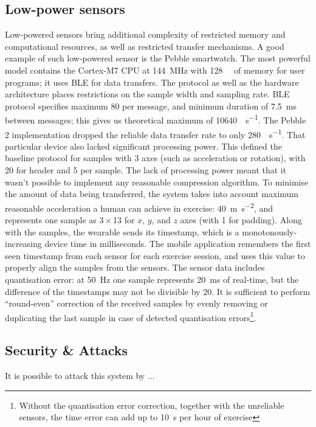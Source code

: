 \subsection{Low-power sensors}
Low-powered sensors bring additional complexity of restricted memory and computational resources, as well as restricted transfer mechanisms. A good example of such low-powered sensor is the Pebble smartwatch. The most powerful model contains the Cortex-M7 CPU at \SI{144}{\mega\hertz} with \SI{128}{\kibi\byte} of memory for user programs; it uses BLE for data transfers. The protocol as well as the hardware architecture places restrictions on the sample width and sampling rate. BLE protocol specifies maximum \SI{80}{\byte} per message, and minimum duration of \SI{7.5}{\milli\second} between messages; this gives us theoretical maximum of \SI{10640}{\byte\per\second}. The Pebble 2 implementation dropped the reliable data transfer rate to only \SI{280}{\byte\per\second}. That particular device also lacked significant processing power. This defined the baseline protocol for samples with 3 axes (such as acceleration or rotation), with \SI{20}{\byte} for header and \SI{5}{\byte} per sample. The lack of processing power meant that it wasn't possible to implement any reasonable compression algorithm. To minimise the amount of data being transferred, the system takes into account maximum reasonable acceleration a human can achieve in exercise: \SI{40}{\meter\second^{-2}}, and represents one sample as $3 \times$\SI{13}{\bit} for $x$, $y$, and $z$ axes (with \SI{1}{\bit} for padding). Along with the samples, the wearable sends its timestamp, which is a monotonously-increasing device time in milliseconds. The mobile application remembers the first seen timestamp from each sensor for each exercise session, and uses this value to properly align the samples from the sensors. The sensor data includes quantisation error: at \SI{50}{\hertz} one sample represents \SI{20}{\milli\second} of real-time, but the difference of the timestamps may not be divisible by $20$. It is sufficient to perform ``round-even'' correction of the received samples by evenly removing or duplicating the last sample in case of detected quantisation errors\footnote{Without the quantisation error correction, together with the unreliable sensors, the time error can add up to \SI{10}{\second} per hour of exercise}.

\subsection{Security \& Attacks}
It is possible to attack this system by \cite{Fu:AuI932n8}...

